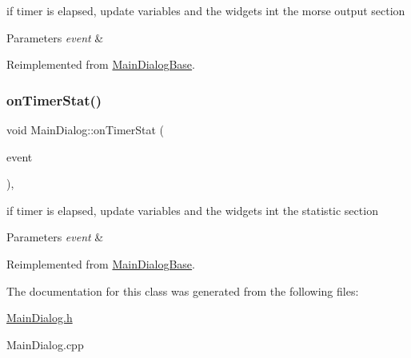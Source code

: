if timer is elapsed, update variables and the widgets int the morse output section 


\begin{DoxyParams}{Parameters}
{\em event} & \\
\hline
\end{DoxyParams}


Reimplemented from \hyperlink{classMainDialogBase}{Main\+Dialog\+Base}.

\mbox{\label{classMainDialog_a2b15d3ae06d0b3e1246bcd012f8f758a}} 
\subsubsection{\texorpdfstring{on\+Timer\+Stat()}{onTimerStat()}}
{\footnotesize\ttfamily void Main\+Dialog\+::on\+Timer\+Stat (\begin{DoxyParamCaption}\item[{wx\+Timer\+Event \&}]{event }\end{DoxyParamCaption})\hspace{0.3cm}{\ttfamily [protected]}, {\ttfamily [virtual]}}



if timer is elapsed, update variables and the widgets int the statistic section 


\begin{DoxyParams}{Parameters}
{\em event} & \\
\hline
\end{DoxyParams}


Reimplemented from \hyperlink{classMainDialogBase}{Main\+Dialog\+Base}.



The documentation for this class was generated from the following files\+:\begin{DoxyCompactItemize}
\item 
\hyperlink{MainDialog_8h}{Main\+Dialog.\+h}\item 
Main\+Dialog.\+cpp\end{DoxyCompactItemize}
